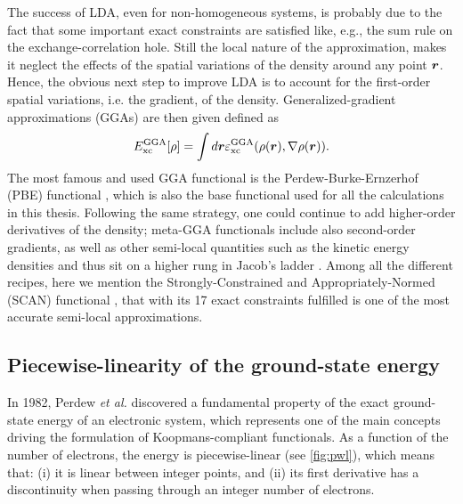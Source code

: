 The success of LDA, even for non-homogeneous systems, is probably due to the fact that some important exact constraints are satisfied like, e.g., the sum rule on the exchange-correlation hole. Still the local nature of the approximation, makes it neglect the effects of the spatial variations of the density around any point ${\bm r}$. Hence, the obvious next step to improve LDA is to account for the first-order spatial variations, i.e. the gradient, of the density. Generalized-gradient approximations (GGAs) are then given defined as
%
\begin{equation}
    E^{\rm GGA}_{\rm xc}[\rho] = \int d{\bm r} \varepsilon^{\rm GGA}_{\rm xc}(\rho({\bm r}), \nabla\rho({\bm r})) .
    \label{eq:gga-xc}
\end{equation}
%
The most famous and used GGA functional is the Perdew-Burke-Ernzerhof (PBE) functional \cite{perdew_generalized_1996}, which is also the base functional used for all the calculations in this thesis. Following the same strategy, one could continue to add higher-order derivatives of the density; meta-GGA functionals include also second-order gradients, as well as other semi-local quantities such as the kinetic energy densities and thus sit on a higher rung in Jacob's ladder \cite{perdew_jacobs_2001}. Among all the different recipes, here we mention the Strongly-Constrained and Appropriately-Normed (SCAN) functional \cite{sun_accurate_2016}, that with its 17 exact constraints fulfilled is one of the most accurate semi-local approximations.

\subsection{Piecewise-linearity of the ground-state energy\label{sec:pwl-energy}}
In 1982, Perdew \emph{et al.} \cite{perdew_density-functional_1982} discovered a fundamental property of the exact ground-state energy of an electronic system, which represents one of the main concepts driving the formulation of Koopmans-compliant functionals. As a function of the number of electrons, the energy is piecewise-linear (see \cref{fig:pwl}), which means that: (i) it is linear between integer points, and (ii) its first derivative has a discontinuity when passing through an integer number of electrons.

